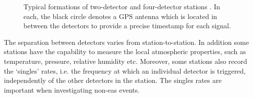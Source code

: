 \begin{figure}[htbp!]
	\centering
	\qquad
	\qquad
	\caption{Typical formations of two-detector and four-detector stations \citep{fokkema_hisparc_2012, van_dam_hisparc_2020}. In each, the black circle denotes a GPS antenna which is located in between the detectors to provide a precise timestamp for each signal.}
	\label{fig:HS_station_layouts}
\end{figure}


The separation between detectors varies from station-to-station. In addition some stations have the capability to measure the local atmospheric properties, such as temperature, pressure, relative humidity etc. Moreover, some stations also record the `singles' rates, i.e. the frequency at which an individual detector is triggered, independently of the other detectors in the station. The singles rates are important when investigating non-\gls{eas} events.

